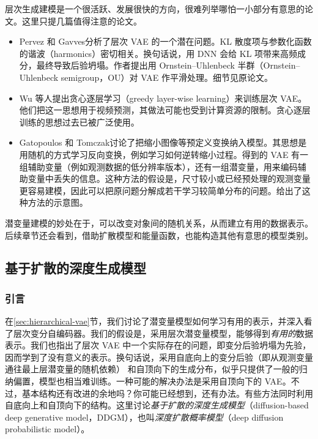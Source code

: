 层次生成建模是一个很活跃、发展很快的方向，很难列举哪怕一小部分有意思的论文。这里只提几篇值得注意的论文。
\begin{itemize}
\item Pervez 和 Gavves分析了层次 VAE 的一个潜在问题。KL 散度项与参数化函数的谐波（harmonics）密切相关。换句话说，用 DNN 会给 KL 项带来高频成分，最终导致后验坍塌。作者提出用 Ornstein–Uhlenbeck 半群（Ornstein–Uhlenbeck semigroup，OU）对 VAE 作平滑处理。细节见原论文。
\item Wu 等人提出贪心逐层学习（greedy layer-wise learning）来训练层次 VAE。他们把这一思想用于视频预测，其做法可能也受到计算资源的限制。贪心逐层训练的思想过去已被广泛使用。
\item Gatopoulos 和 Tomczak讨论了把缩小图像等预定义变换纳入模型。其思想是用随机的方式学习反向变换，例如学习如何逆转缩小过程。得到的 VAE 有一组辅助变量（例如观测数据的低分辨率版本），还有一组潜变量，用来编码辅助变量中丢失的信息。这种方法的假设是，尺寸较小或已经预处理的观测变量更容易建模，因此可以把原问题分解成若干学习较简单分布的问题。给出了这种方法的示意图。
\end{itemize}
潜变量建模的妙处在于，可以改变对象间的随机关系，从而建立有用的数据表示。后续章节还会看到，借助扩散模型和能量函数，也能构造其他有意思的模型类别。

\subsection{基于扩散的深度生成模型}
\label{sec:ddgm}
\subsubsection{引言}
在\ref{sec:hierarchical-vae}节，我们讨论了潜变量模型如何学习有用的表示，并深入看了层次变分自编码器。我们的假设是，采用层次潜变量模型，能够得到\emph{有用的}数据表示。我们也指出了层次 VAE 中一个实际存在的问题，即变分后验坍塌为先验，因而学到了没有意义的表示。换句话说，采用自底向上的变分后验（即从观测变量通往最上层潜变量的随机依赖）
和自顶向下的生成分布，似乎只提供了一般的归纳偏置，模型也相当难训练。一种可能的解决办法是采用自顶向下的 VAE。不过，基本结构还有改进的余地吗？你可能已经想到，还有办法。有些方法同时利用自底向上和自顶向下的结构。这里讨论\emph{基于扩散的深度生成模型}（diffusion-based deep generative model，DDGM），也叫\emph{深度扩散概率模型}（deep diffusion probabilistic model）。


